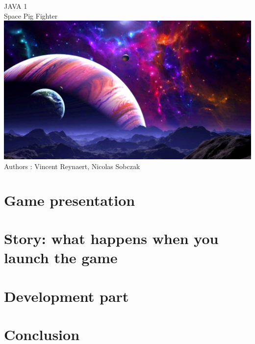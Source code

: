 \documentclass[twoside]{book}
\newcommand{\+}{\discretionary{\mbox{\scriptsize$\hookleftarrow$}}{}{}}
\newcommand{\clearemptydoublepage}{%
  \newpage{\pagestyle{empty}\cleardoublepage}%
}
\begin{document}
\hypersetup{pageanchor=false,
             bookmarksnumbered=true,
             pdfencoding=unicode
            }
\begin{titlepage}
\vspace*{3cm}
\begin{center}%
{\Huge JAVA 1}\\
\vspace*{3cm}
{\huge Space Pig Fighter  }\\ %
\vspace{4\baselineskip}
\includegraphics[width=450pt]{../../Images/space.jpg}\\
\vspace{11\baselineskip}
{\large Authors : Vincent Reynaert, Nicolas Sobczak}\\
\end{center}
\end{titlepage}
\clearemptydoublepage
\tableofcontents
\clearemptydoublepage
{}
\hypersetup{pageanchor=true}

\chapter{Game presentation}

\chapter{Story: what happens when you launch the game}

\chapter{Development part}

\chapter{Conclusion}

\end{document}
